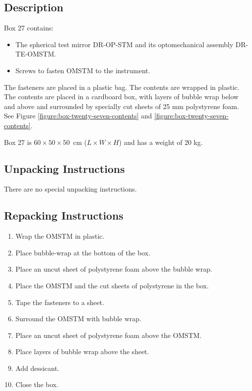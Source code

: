 \documentclass{article}
\begin{document}
\subsection{Description}

Box 27 contains:

\begin{itemize}
    \item The spherical test mirror DR-OP-STM and its optomechanical assembly DR-TE-OMSTM.
    \item Screws to fasten OMSTM to the instrument.
\end{itemize}

The fasteners are placed in a plastic bag. The contents are wrapped in plastic. The contents are placed in a cardboard box, with layers of bubble wrap below and above and surrounded by specially cut sheets of 25 mm polystyrene foam. See Figure \ref{figure:box-twenty-seven-contents} and \ref{figure:box-twenty-seven-contents}.

Box 27 is  $60 \times 50 \times 50$~cm ($L \times W \times H$) and has a weight of 20 kg.

\subsection{Unpacking Instructions}

There are no special unpacking instructions.

\subsection{Repacking Instructions}

\begin{enumerate}
    \item Wrap the OMSTM in plastic.
    \item Place bubble-wrap at the bottom of the box.
    \item Place an uncut sheet of polystyrene foam above the bubble wrap.
    \item Place the OMSTM and the cut sheets of polystyrene in the box.
    \item Tape the fasteners to a sheet.
    \item Surround the OMSTM with bubble wrap.
    \item Place an uncut sheet of polystyrene foam above the OMSTM.
    \item Place layers of bubble wrap above the sheet.
    \item Add dessicant.    
    \item Close the box.
\end{enumerate}
\end{document}
